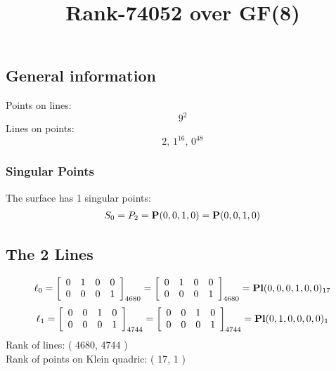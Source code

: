\documentclass{article}
\newcommand\setTBstruts{\def\T{\rule{0pt}{2.6ex}}%
\def\B{\rule[-1.2ex]{0pt}{0pt}}}
\newcommand{\bP}{{\bf P}}
\begin{document}
 
\setTBstruts



{\allowdisplaybreaks%






\title{Rank-74052 over GF(8)}
\author{}%
\maketitle%
%
{}



\subsection*{General information}
Points on lines:
$$
9^2$$
Lines on points:
$$
2,\,1^{16},\,0^{48}$$
\subsubsection*{Singular Points}
The surface has 1 singular points:\\
\begin{align*}
S_{0} &= P_{2}=\bP(0, 0, 1, 0) = \bP(0, 0, 1, 0)\\
\end{align*}
\subsection*{The 2 Lines}
$$
\ell_{0} = 
\left[
\begin{array}{*{4}{r}}
0 & 1 & 0 & 0\\
0 & 0 & 0 & 1\\
\end{array}
\right]
_{4680}
=
\left[
\begin{array}{*{4}c}
0  & 1  & 0  & 0\\
0  & 0  & 0  & 1\\
\end{array}
\right]_{4680}
={\rm\bf Pl}(0,0,0,1,0,0 )_{17}$$
$$
\ell_{1} = 
\left[
\begin{array}{*{4}{r}}
0 & 0 & 1 & 0\\
0 & 0 & 0 & 1\\
\end{array}
\right]
_{4744}
=
\left[
\begin{array}{*{4}c}
0  & 0  & 1  & 0\\
0  & 0  & 0  & 1\\
\end{array}
\right]_{4744}
={\rm\bf Pl}(0,1,0,0,0,0 )_{1}$$
Rank of lines: ( 4680, 4744 )\\
Rank of points on Klein quadric: ( 17, 1 )\\
}
\end{document}
